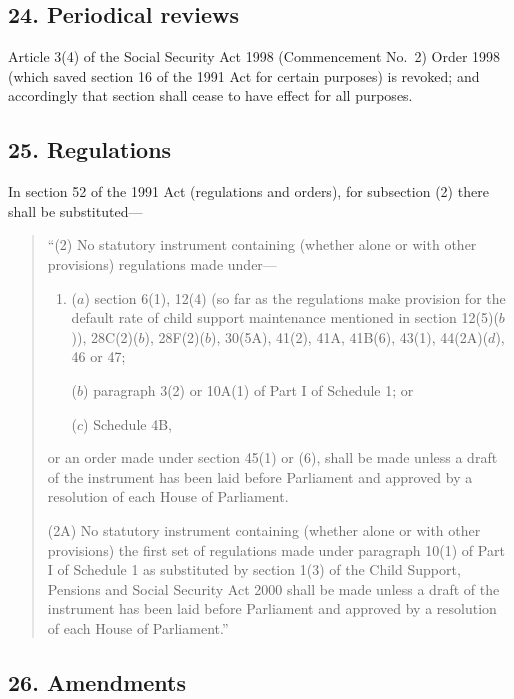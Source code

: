 \documentclass[12pt,a4paper]{article}
\begin{document}
\subsection{24. Periodical reviews}

Article 3(4)  of the  Social Security Act 1998 (Commencement No.\ 2) Order 1998 (which saved section 16 of the 1991 Act for certain purposes) is revoked; and accordingly that section shall cease to have effect for all purposes.

\subsection{25. Regulations}

In section 52 of the 1991 Act (regulations and orders), for subsection (2)  there shall be substituted—
\begin{quotation}
“(2) No statutory instrument containing (whether alone or with other provisions) regulations made under—
\begin{enumerate}\item[]
($a$) section 6(1), 12(4)  (so far as the regulations make provision for the default rate of child support maintenance mentioned in section 12(5)($b$)), 28C(2)($b$), 28F(2)($b$), 30(5A), 41(2), 41A, 41B(6), 43(1), 44(2A)($d$), 46 or 47;

($b$) paragraph 3(2)  or 10A(1)  of Part I of Schedule 1; or

($c$) Schedule 4B,
\end{enumerate}
or an order made under section 45(1)  or (6), shall be made unless a draft of the instrument has been laid before Parliament and approved by a resolution of each House of Parliament.

(2A) No statutory instrument containing (whether alone or with other provisions) the first set of regulations made under paragraph 10(1)  of Part I of Schedule 1 as substituted by section 1(3)  of the Child Support, Pensions and Social Security Act 2000 shall be made unless a draft of the instrument has been laid before Parliament and approved by a resolution of each House of Parliament.”
\end{quotation}


\subsection{26. Amendments}
\end{document}
